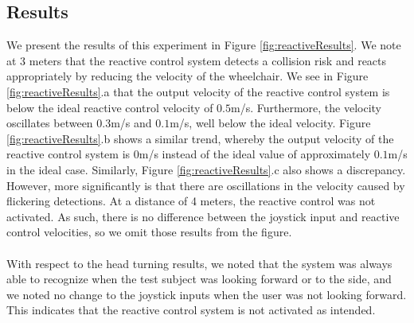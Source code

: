 \subsection{Results}
We present the results of this experiment in Figure \ref{fig:reactiveResults}. We note at $3$ meters that the reactive control system detects a collision risk and reacts appropriately by reducing the velocity of the wheelchair. We see in Figure \ref{fig:reactiveResults}.a that the output velocity of the reactive control system is below the ideal reactive control velocity of $0.5$m/s. Furthermore, the velocity oscillates between $0.3$m/s and $0.1$m/s, well below the ideal velocity. Figure \ref{fig:reactiveResults}.b shows a similar trend, whereby the output velocity of the reactive control system is $0$m/s instead of the ideal value of approximately $0.1$m/s in the ideal case. Similarly, Figure \ref{fig:reactiveResults}.c also shows a discrepancy. However, more significantly is that there are oscillations in the velocity caused by flickering detections. At a distance of 4 meters, the reactive control was not activated. As such, there is no difference between the joystick input and reactive control velocities, so we omit those results from the figure.

\paragraph{}With respect to the head turning results, we noted that the system was always able to recognize when the test subject was looking forward or to the side, and we noted no change to the joystick inputs when the user was not looking forward. This indicates that the reactive control system is not activated as intended.

